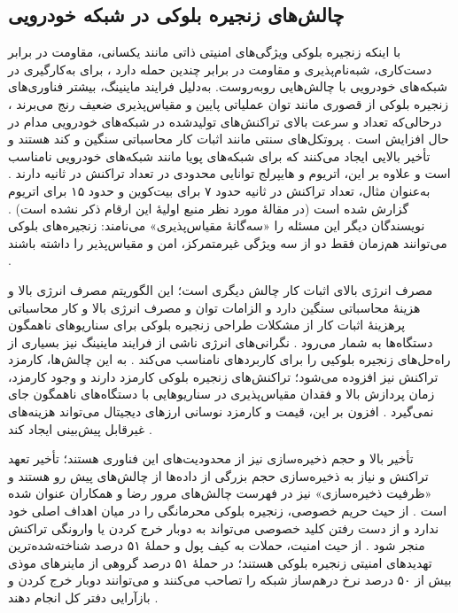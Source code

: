 \documentclass[12pt,a4paper]{article}
\begin{document}
\subsection{چالش‌های زنجیره بلوکی در شبکه خودرویی}

با اینکه زنجیره بلوکی ویژگی‌های امنیتی ذاتی مانند یکسانی، مقاومت در برابر دست‌کاری، شبه‌نام‌پذیری و مقاومت در برابر چندین حمله دارد \cite{razaBlockchainBasedReputationTrust2024}، برای به‌کارگیری در شبکه‌های خودرویی با چالش‌هایی روبه‌روست. به‌دلیل فرایند ماینینگ، بیشتر فناوری‌های زنجیره بلوکی از قصوری مانند توان عملیاتی پایین و مقیاس‌پذیری ضعیف رنج می‌برند \cite{ghovanlooyghajarSBTMSScalableBlockchain2021}، درحالی‌که تعداد و سرعت بالای تراکنش‌های تولیدشده در شبکه‌های خودرویی مدام در حال افزایش است \cite{ghovanlooyghajarSBTMSScalableBlockchain2021}. پروتکل‌های سنتی مانند اثبات کار محاسباتی سنگین و کند هستند و تأخیر بالایی ایجاد می‌کنند که برای شبکه‌های پویا مانند شبکه‌های خودرویی نامناسب است و علاوه بر این، اتریوم و هایپرلج توانایی محدودی در تعداد تراکنش در ثانیه دارند \cite{razaBlockchainBasedReputationTrust2024}. به‌عنوان مثال، تعداد تراکنش در ثانیه حدود ۷ برای بیت‌کوین و حدود ۱۵ برای اتریوم گزارش شده است (در مقالهٔ مورد نظر منبع اولیهٔ این ارقام ذکر نشده است) \cite{IOTATANGLE20}. نویسندگان دیگر این مسئله را «سه‌گانهٔ مقیاس‌پذیری» می‌نامند: زنجیره‌های بلوکی می‌توانند هم‌زمان فقط دو از سه ویژگی غیرمتمرکز، امن و مقیاس‌پذیر را داشته باشند \cite{silvanoIotaTangleCryptocurrency2020}.

مصرف انرژی بالای اثبات کار چالش دیگری است؛ این الگوریتم مصرف انرژی بالا و هزینهٔ محاسباتی سنگین دارد \cite{razaBlockchainBasedReputationTrust2024} و الزامات توان و مصرف انرژی بالا و کار محاسباتی پرهزینهٔ اثبات کار از مشکلات طراحی زنجیره بلوکی برای سناریو‌های ناهمگون دستگاه‌ها به شمار می‌رود \cite{silvanoIotaTangleCryptocurrency2020}. نگرانی‌های انرژی ناشی از فرایند ماینینگ نیز بسیاری از راه‌حل‌های زنجیره بلوکیی را برای کاربرد‌های  نامناسب می‌کند \cite{sealeyIOTATangle202022}. به این چالش‌ها، کارمزد تراکنش نیز افزوده می‌شود؛ تراکنش‌های زنجیره بلوکی کارمزد دارند \cite{IOTATANGLE20, silvanoIotaTangleCryptocurrency2020} و وجود کارمزد، زمان پردازش بالا و فقدان مقیاس‌پذیری در سناریو‌هایی با دستگاه‌های ناهمگون جای نمی‌گیرد \cite{silvanoIotaTangleCryptocurrency2020}. افزون بر این، قیمت و کارمزد نوسانی ارز‌های دیجیتال می‌تواند هزینه‌های غیرقابل پیش‌بینی ایجاد کند \cite{silvanoIotaTangleCryptocurrency2020}.

تأخیر بالا و حجم ذخیره‌سازی نیز از محدودیت‌های این فناوری هستند؛ تأخیر تعهد تراکنش و نیاز به ذخیره‌سازی حجم بزرگی از داده‌ها از چالش‌های پیش رو هستند \cite{silvanoIotaTangleCryptocurrency2020} و «ظرفیت ذخیره‌سازی» نیز در فهرست چالش‌های مرور رضا و همکاران عنوان شده است \cite{razaBlockchainBasedReputationTrust2024}. از حیث حریم خصوصی، زنجیره بلوکی محرمانگی را در میان اهداف اصلی خود ندارد و از دست رفتن کلید خصوصی می‌تواند به دوبار خرج کردن یا وارونگی تراکنش منجر شود \cite{razaBlockchainBasedReputationTrust2024}. از حیث امنیت، حملات به کیف پول و حملهٔ ۵۱ درصد شناخته‌شده‌ترین تهدید‌های امنیتی زنجیره بلوکی هستند؛ در حملهٔ ۵۱ درصد گروهی از ماینر‌های موذی بیش از ۵۰ درصد نرخ درهم‌ساز شبکه را تصاحب می‌کنند و می‌توانند دوبار خرج کردن و بازآرایی دفتر کل انجام دهند \cite{razaBlockchainBasedReputationTrust2024}.
\end{document}
